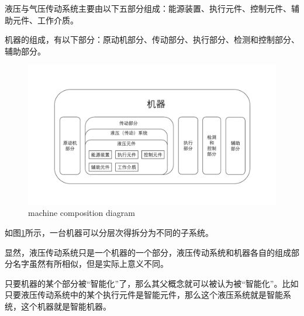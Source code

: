 液压与气压传动系统主要由以下五部分组成\cite{yeyakeben}：能源装置、执行元件、控制元件、辅助元件、工作介质。


机器的组成，有以下部分\cite{jixieshejikeben}：原动机部分、传动部分、执行部分、检测和控制部分、辅助部分。


\begin{figure}[!htp]
	\centering
	\includegraphics[width=\textwidth]{IMG/jiqizucheng.pdf}
		{machine composition diagram}
	\label{fig:jiqizucheng}
\end{figure}

如图\ref{fig:jiqizucheng}所示，一台机器可以分层次得拆分为不同的子系统。

显然，液压传动系统只是一个机器的一个部分，液压传动系统和机器各自的组成部分名字虽然有所相似，但是实际上意义不同。

只要机器的某个部分被“智能化”了，那么其父概念就可以被认为被“智能化”。比如只要液压传动系统中的某个执行元件是智能元件，那么这个液压系统就是智能系统，这个机器就是智能机器。
